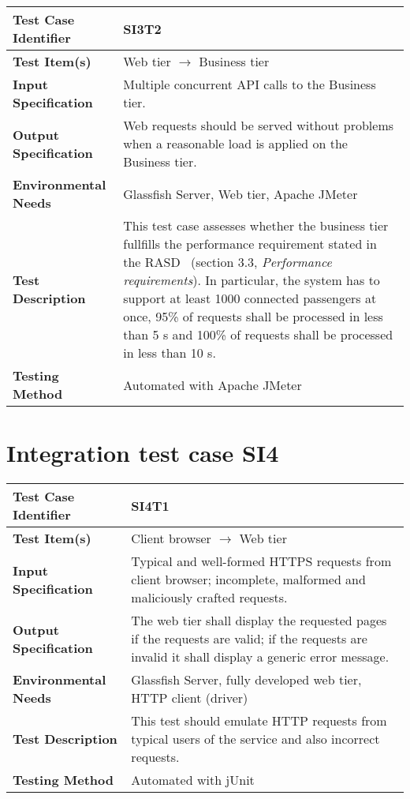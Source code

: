 \vspace{2em}

\noindent\begin{tabular}{l p{}}
    \hline
    \textbf{Test Case Identifier} & SI3T2\\
    \hline
    \textbf{Test Item(s)} & Web tier $\rightarrow$ Business tier\\
    \hline
    \textbf{Input Specification} & Multiple concurrent API calls to the Business tier.\\
    \hline
    \textbf{Output Specification} & Web requests should be served without problems when a reasonable load is applied on the Business tier. \\
    \hline
    \textbf{Environmental Needs} & Glassfish Server, Web tier, Apache JMeter\\
    \hline
    \textbf{Test Description} & This test case assesses whether the business tier fullfills the performance requirement stated in the RASD~\cite{mytaxi-rasd} (section 3.3, \emph{Performance requirements}). In particular, the system has to support at least 1000 connected passengers at once, 95\% of requests shall be processed in less than 5 s and 100\% of requests shall be processed in less than 10 s.\\
    \hline
    \textbf{Testing Method} & Automated with Apache JMeter \\
    \hline
\end{tabular}

\vspace{2em}

\section{Integration test case SI4}

\begin{tabular}{l p{}}
    \hline
    \textbf{Test Case Identifier} & SI4T1\\
    \hline
    \textbf{Test Item(s)} & Client browser $\rightarrow$ Web tier\\
    \hline
    \textbf{Input Specification} & Typical and well-formed HTTPS requests from client browser; incomplete, malformed and maliciously crafted requests.\\
    \hline
    \textbf{Output Specification} & The web tier shall display the requested pages if the requests are valid; if the requests are invalid it shall display a generic error message. \\
    \hline
    \textbf{Environmental Needs} & Glassfish Server, fully developed web tier, HTTP client (driver)\\
    \hline
    \textbf{Test Description} & This test should emulate HTTP requests from typical users of the service and also incorrect requests.\\
    \hline
    \textbf{Testing Method} & Automated with jUnit \\
    \hline
\end{tabular}


